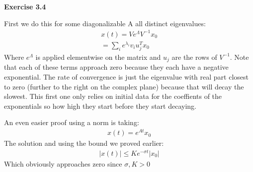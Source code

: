 \documentclass[12pt]{article}
\newenvironment{exercise}[1]{\vspace{.1in}\noindent\textbf{Exercise #1 \hspace{.05em}}}{}
\theoremstyle{definition}
\theoremstyle{remark}
\begin{document}
\begin{exercise}{3.4}

	First we do this for some diagonalizable A all distinct eigenvalues:
	\begin{align}
		x(t)=Ve^{\Lambda}V^{-1}x_0 \\
		=\sum_{i}e^{\lambda_i}v_iu_j^{T}x_0
	\end{align}
	Where $e^{\Lambda}$ is applied elementwise on the matrix and $u_j$ are the rows of $V^{-1}$. Note that each of these terms approach zero because they each have a negative exponential. The rate of convergence is just the eigenvalue with real part closest to zero (further to the right on the complex plane) because that will decay the slowest. This first one only relies on initial data for the coeffients of the exponentials so how high they start before they start decaying.

	An even easier proof using a norm is taking:
	\begin{align}
		x(t)=e^{At}x_0
	\end{align}
	The solution and using the bound we proved earlier:
	\begin{align}
		|x(t)|\leq  Ke^{-\sigma t}|x_0|
	\end{align}
	Which obviously approaches zero since $\sigma,K>0$



\end{exercise}
\end{document}
